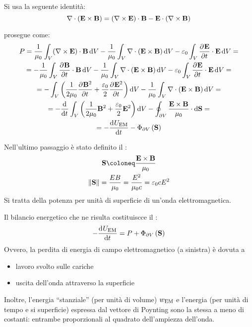 Si usa la seguente identità:
\begin{equation}
    \nabla \cdot (\mathbf{E} \times \mathbf{B}) = (\nabla \times \mathbf{E}) \cdot \mathbf{B} - \mathbf{E} \cdot (\nabla \times \mathbf{B})
\end{equation}

 prosegue come:
\begin{equation}
\begin{gathered}
    P = \frac{1}{\mu_0} \int_V (\curl \E) \cdot \B \,\de V
    - \frac{1}{\mu_0} \int_V \diver (\E \times \B) \,\de V
    - \eps_0 \int_V \parder[\E]{t} \cdot \E \,\de V = \\
    = - \frac{1}{\mu_0} \int_V \parder[\B]{t} \cdot \B \,\de V
    - \frac{1}{\mu_0} \int_V \diver (\E \times \B) \,\de V
    - \eps_0 \int_V \parder[\E]{t} \cdot \E \,\de V = \\
    = - \int_V \pts{\frac{1}{2 \mu_0} \parder[\B^2]{t} + \frac{\eps_0}{2} \parder[\E^2]{t}} \de V
    - \frac{1}{\mu_0} \int_V \diver (\E \times \B) \,\de V = \\
    = - \der{t} \int_V \pts{\frac{1}{2 \mu_0} \B^2 + \frac{\eps_0}{2} \E^2} \de V
    - \oint_{\partial V} \frac{\E \times \B}{\mu_0} \sde = \\
    = -\der[U\EM]{t} - \flux{\partial V}{\poy}
\end{gathered}
\end{equation}

Nell'ultimo passaggio è stato definito il :
\begin{gather}
    \poy \coloneq \frac{\E \times \B}{\mu_0} \\
    \norm{\poy} = \frac{E B}{\mu_0} = \frac{E^2}{\mu_0 c} = \eps_0 c E^2
\end{gather}
Si tratta della potenza per unità di superficie di un'onda elettromagnetica.

Il bilancio energetico che ne risulta costituiscce il :
\begin{gather}
    -\der[U\EM]{t} = P + \flux{\partial V}{\poy}
\end{gather}
Ovvero, la perdita di energia di campo elettromagnetico (a sinistra) è dovuta a
\begin{itemize}
    \item lavoro svolto sulle cariche
    \item uscita dell'onda attraverso la superficie
\end{itemize}

Inoltre, l'energia ``stanziale'' (per unità di volume) $w_\mathrm{EM}$ e l'energia (per unità di tempo e si superficie) espressa dal vettore di Poynting sono la stessa a meno di costanti: entrambe proporzionali al quadrato dell'ampiezza dell'onda.

